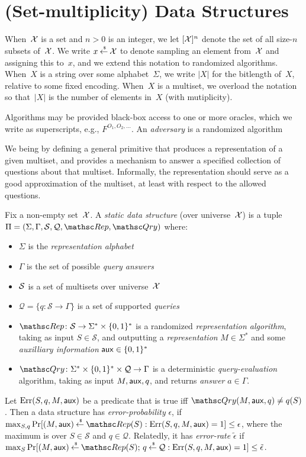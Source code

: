 \section{(Set-multiplicity) Data Structures}
\def\pub{{\sf pub}}
\def\aux{{\sf aux}}

When~${\cal X}$ is a set and $n>0$ is an integer, we let $[{\cal X}]^n$ denote the set of all size-$n$ subsets of~${\cal X}$. We write $x {\:\stackrel{{\scriptscriptstyle \hspace{0.2em}\$}} {\leftarrow}\:} {\cal X}$ to denote sampling an element from~${\cal X}$ and assigning this to~$x$, and we extend this notation to randomized algorithms.  When~$X$ is a string over some alphabet~$\Sigma$, we write $|X|$ for the bitlength of~$X$, relative to some fixed encoding.  When~$X$ is a multiset, we overload the notation so that~$|X|$ is the number of elements in~$X$ (with mutiplicity).

Algorithms may be provided black-box access to one or more oracles, which we write as superscripts, e.g., $F^{O_1,O_2,\ldots}$.  An \emph{adversary} is a randomized algorithm

  We being by defining a general primitive that produces a representation of a given multiset, and provides a mechanism to answer a specified collection of questions about that multiset.  Informally, the representation should serve as a good approximation of the multiset, at least with respect to the allowed questions.
\begin{definition} \rm
Fix a non-empty set~${\cal X}$. A \emph{static data structure} (over universe~${\cal X}$)
is a tuple $\setprim=(\Sigma,\Gamma,\calS,\calQ,\Rep, \Qry)$ where:
\begin{itemize}
\item $\Sigma$ is the \emph{representation alphabet}
\item $\Gamma$ is the set of possible \emph{query answers}
\item ${\cal S}$ is a set  of multisets over universe~${\cal X}$
\item $\mathcal{Q}=\{q \colon \mathcal{S} \to \Gamma\}$ is a set of supported \emph{queries}
\item $\Rep \colon \mathcal{S} \to \Sigma^* \times \bits^*$ is a randomized \emph{representation algorithm}, taking as input $S \in \mathcal{S}$, and outputting a \emph{representation} $M \in \Sigma^*$ and some \emph{auxilliary information} $\aux \in \bits^*$
\item $\Qry\colon \Sigma^* \times \bits^* \times \calQ \to \Gamma$ is a deterministic \emph{query-evaluation} algorithm, taking as input $M, \aux, q$, and returns \emph{answer} $a \in \Gamma$.
\end{itemize}
Let $\mathrm{Err}(S,q,M,\aux)$ be a predicate that is true iff $\Qry(M, \aux, q) \neq q(S)$.  Then a data structure
has \emph{error-probability} $\epsilon$, if
$\max_{S,q}\Pr[(M,\aux) \getsr \Rep(S) : \mathrm{Err}(S,q,M,\aux)=1 ] \leq \epsilon$,
where the maximum is over $S \in \mathcal{S}$ and $q \in \mathcal{Q}$.  Relatedly, it has \emph{error-rate} $\tilde{\epsilon}$ if
$\max_{S}\Pr[(M,\aux) \getsr \Rep(S);\, q \getsr \calQ : \mathrm{Err}(S,q,M,\aux)=1] \leq \tilde{\epsilon}$.
\end{definition}

